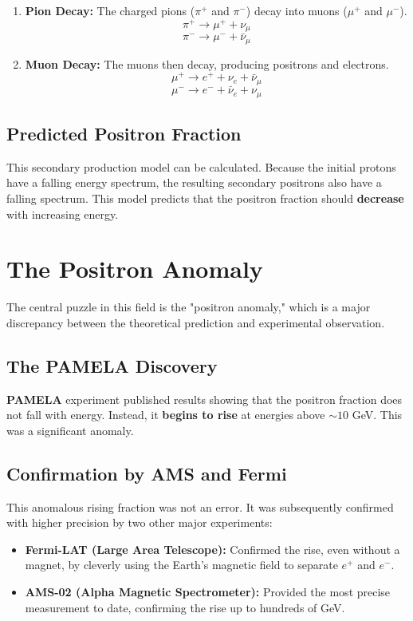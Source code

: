 \documentclass{sciposter}
\begin{document}
\begin{multicols}{3}
\begin{enumerate}
    \item \textbf{Pion Decay:} The charged pions ($\pi^+$ and $\pi^-$) decay into muons ($\mu^+$ and $\mu^-$).
    $$ \pi^+ \rightarrow \mu^+ + \nu_{\mu} $$
    $$ \pi^- \rightarrow \mu^- + \bar{\nu}_{\mu} $$
    
    \item \textbf{Muon Decay:} The muons then decay, producing positrons and electrons.
    $$ \mu^+ \rightarrow e^+ + \nu_e + \bar{\nu}_{\mu} $$
    $$ \mu^- \rightarrow e^- + \bar{\nu}_e + \nu_{\mu} $$
\end{enumerate}

\subsection{Predicted Positron Fraction}
This secondary production model can be calculated. Because the initial protons have a falling energy spectrum, the resulting secondary positrons also have a falling spectrum. This model predicts that the positron fraction should \textbf{decrease} with increasing energy.

\section{The Positron Anomaly}
The central puzzle in this field is the "positron anomaly," which is a major discrepancy between the theoretical prediction and experimental observation.

\subsection{The PAMELA Discovery}
\textbf{PAMELA}  experiment published results showing that the positron fraction does not fall with energy. Instead, it \textbf{begins to rise} at energies above $\sim 10$ GeV. This was a significant anomaly.

\subsection{Confirmation by AMS and Fermi}
This anomalous rising fraction was not an error. It was subsequently confirmed with higher precision by two other major experiments:
\begin{itemize}
    \item \textbf{Fermi-LAT (Large Area Telescope):} Confirmed the rise, even without a magnet, by cleverly using the Earth's magnetic field to separate $e^+$ and $e^-$.
    \item \textbf{AMS-02 (Alpha Magnetic Spectrometer):} Provided the most precise measurement to date, confirming the rise up to hundreds of GeV.
\end{itemize}


\end{multicols}
\end{document}
